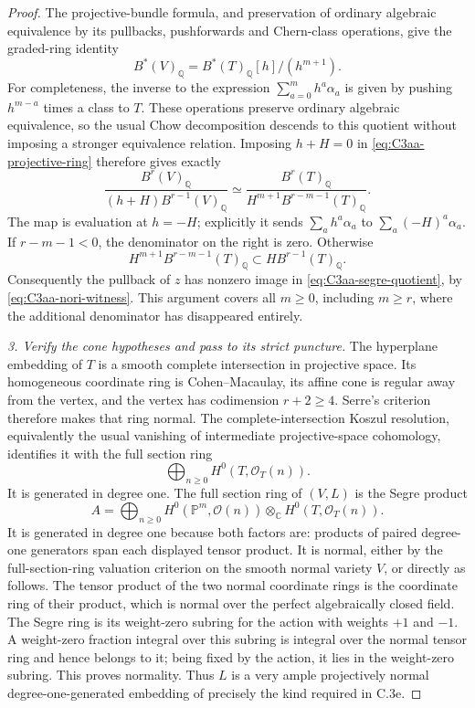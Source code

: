 \begin{proof}
The projective-bundle formula, and preservation of
ordinary algebraic equivalence by its pullbacks,
pushforwards and Chern-class operations, give the
graded-ring identity
\begin{equation}\label{eq:C3aa-projective-ring}
 B^*(V)_{\mathbb Q}
        =B^*(T)_{\mathbb Q}[h]/(h^{m+1}).
\end{equation}
For completeness, the inverse to the expression
$\sum_{a=0}^m h^a\alpha_a$ is given by pushing
$h^{m-a}$ times a class to $T$. These operations
preserve ordinary algebraic equivalence, so the
usual Chow decomposition descends to this quotient
without imposing a stronger equivalence relation.
Imposing $h+H=0$ in \eqref{eq:C3aa-projective-ring}
therefore gives exactly
\begin{equation}\label{eq:C3aa-segre-quotient}
 \frac{B^r(V)_{\mathbb Q}}
      {(h+H)B^{r-1}(V)_{\mathbb Q}}
 \simeq
 \frac{B^r(T)_{\mathbb Q}}
      {H^{m+1}B^{r-m-1}(T)_{\mathbb Q}}.
\end{equation}
The map is evaluation at $h=-H$; explicitly it sends
$\sum_a h^a\alpha_a$ to $\sum_a(-H)^a\alpha_a$.
If $r-m-1<0$, the denominator on the right is zero.
Otherwise
\[
 H^{m+1}B^{r-m-1}(T)_{\mathbb Q}
           \subset H B^{r-1}(T)_{\mathbb Q}.
\]
Consequently the pullback of $z$ has nonzero image
in \eqref{eq:C3aa-segre-quotient}, by
\eqref{eq:C3aa-nori-witness}. This argument covers
all $m\ge0$, including $m\ge r$, where the additional
denominator has disappeared entirely.

\emph{3. Verify the cone hypotheses and pass to its strict puncture.}
The hyperplane embedding of $T$ is a smooth complete
intersection in projective space. Its homogeneous
coordinate ring is Cohen--Macaulay, its affine cone
is regular away from the vertex, and the vertex has
codimension $r+2\ge4$. Serre's criterion therefore
makes that ring normal. The complete-intersection
Koszul resolution, equivalently the usual vanishing
of intermediate projective-space cohomology, identifies
it with the full section ring
\[
                    \bigoplus_{n\ge0}H^0(T,\mathcal O_T(n)).
\]
It is generated in degree one. The full section ring
of $(V,L)$ is the Segre product
\[
 A=\bigoplus_{n\ge0}
       H^0(\mathbb P^m,\mathcal O(n))
          \otimes_{\mathbb C} H^0(T,\mathcal O_T(n)).
\]
It is generated in degree one because both factors
are: products of paired degree-one generators span
each displayed tensor product. It is normal, either
by the full-section-ring valuation criterion on the
smooth normal variety $V$, or directly as follows.
The tensor product of the two normal coordinate
rings is the coordinate ring of their product,
which is normal over the perfect algebraically
closed field. The Segre ring is its weight-zero
subring for the action with weights $+1$ and $-1$.
A weight-zero fraction integral over this subring
is integral over the normal tensor ring and hence
belongs to it; being fixed by the action, it lies
in the weight-zero subring. This proves normality.
Thus $L$ is a very ample projectively normal
degree-one-generated embedding of precisely the
kind required in C.3e.


\end{proof}
